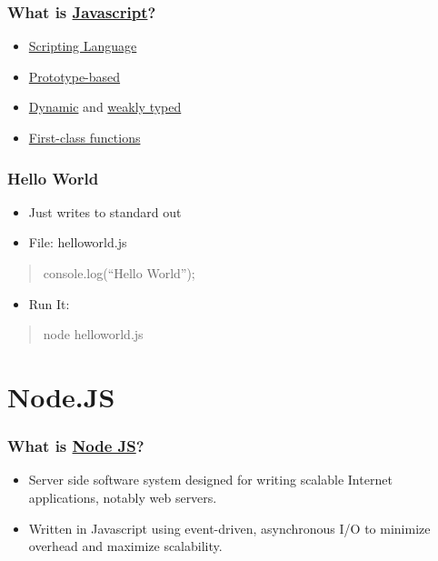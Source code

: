 \documentclass[ignorenonframetext,]{beamer}
\begin{document}
\begin{frame}\frametitle{What is
\href{http://en.wikipedia.org/wiki/JavaScript}{Javascript}?}

\begin{itemize}[<+->]
\item
  \href{http://en.wikipedia.org/wiki/Scripting\_language}{Scripting
  Language}
\item
  \href{http://en.wikipedia.org/wiki/Prototype-based}{Prototype-based}
\item
  \href{http://en.wikipedia.org/wiki/Dynamic\_language}{Dynamic} and
  \href{http://en.wikipedia.org/wiki/Weak\_typing}{weakly typed}
\item
  \href{http://en.wikipedia.org/wiki/First-class\_functions}{First-class
  functions}
\end{itemize}
\end{frame}

\begin{frame}\frametitle{Hello World}

\begin{itemize}
\item
  Just writes to standard out
\item
  File: helloworld.js
\end{itemize}
\begin{quote}
console.log(``Hello World'');

\end{quote}
\begin{itemize}
\item
  Run It:
\end{itemize}
\begin{quote}
node helloworld.js

\end{quote}
\end{frame}

\section{Node.JS}

\begin{frame}\frametitle{What is
\href{http://en.wikipedia.org/wiki/Nodejs}{Node JS}?}

\begin{itemize}
\item
  Server side software system designed for writing scalable Internet
  applications, notably web servers.
\item
  Written in Javascript using event-driven, asynchronous I/O to minimize
  overhead and maximize scalability.
\end{itemize}
\end{frame}
\end{document}

